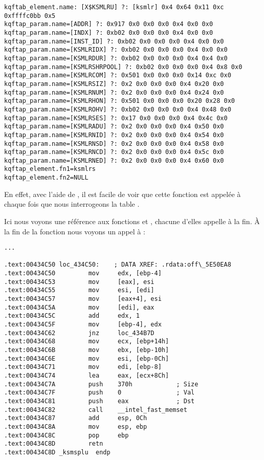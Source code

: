 \begin{lstlisting}[caption=Résultat de \OracleTablesName]
kqftab_element.name: [X$KSMLRU] ?: [ksmlr] 0x4 0x64 0x11 0xc 0xffffc0bb 0x5
kqftap_param.name=[ADDR] ?: 0x917 0x0 0x0 0x0 0x4 0x0 0x0
kqftap_param.name=[INDX] ?: 0xb02 0x0 0x0 0x0 0x4 0x0 0x0
kqftap_param.name=[INST_ID] ?: 0xb02 0x0 0x0 0x0 0x4 0x0 0x0
kqftap_param.name=[KSMLRIDX] ?: 0xb02 0x0 0x0 0x0 0x4 0x0 0x0
kqftap_param.name=[KSMLRDUR] ?: 0xb02 0x0 0x0 0x0 0x4 0x4 0x0
kqftap_param.name=[KSMLRSHRPOOL] ?: 0xb02 0x0 0x0 0x0 0x4 0x8 0x0
kqftap_param.name=[KSMLRCOM] ?: 0x501 0x0 0x0 0x0 0x14 0xc 0x0
kqftap_param.name=[KSMLRSIZ] ?: 0x2 0x0 0x0 0x0 0x4 0x20 0x0
kqftap_param.name=[KSMLRNUM] ?: 0x2 0x0 0x0 0x0 0x4 0x24 0x0
kqftap_param.name=[KSMLRHON] ?: 0x501 0x0 0x0 0x0 0x20 0x28 0x0
kqftap_param.name=[KSMLROHV] ?: 0xb02 0x0 0x0 0x0 0x4 0x48 0x0
kqftap_param.name=[KSMLRSES] ?: 0x17 0x0 0x0 0x0 0x4 0x4c 0x0
kqftap_param.name=[KSMLRADU] ?: 0x2 0x0 0x0 0x0 0x4 0x50 0x0
kqftap_param.name=[KSMLRNID] ?: 0x2 0x0 0x0 0x0 0x4 0x54 0x0
kqftap_param.name=[KSMLRNSD] ?: 0x2 0x0 0x0 0x0 0x4 0x58 0x0
kqftap_param.name=[KSMLRNCD] ?: 0x2 0x0 0x0 0x0 0x4 0x5c 0x0
kqftap_param.name=[KSMLRNED] ?: 0x2 0x0 0x0 0x0 0x4 0x60 0x0
kqftap_element.fn1=ksmlrs
kqftap_element.fn2=NULL
\end{lstlisting}

En effet, avec l'aide de \tracer, il est facile de voir que cette fonction est appelée
à chaque fois que nous interrogeons la table .

Ici nous voyons une référence aux fonctions  et ,
chacune d'elles appelle  à la fin.
À la fin de la fonction  nous voyons un appel à :

\begin{lstlisting}[caption=ksm.o,style=customasmx86]
...

.text:00434C50 loc_434C50:    ; DATA XREF: .rdata:off\_5E50EA8
.text:00434C50         mov     edx, [ebp-4]
.text:00434C53         mov     [eax], esi
.text:00434C55         mov     esi, [edi]
.text:00434C57         mov     [eax+4], esi
.text:00434C5A         mov     [edi], eax
.text:00434C5C         add     edx, 1
.text:00434C5F         mov     [ebp-4], edx
.text:00434C62         jnz     loc_434B7D
.text:00434C68         mov     ecx, [ebp+14h]
.text:00434C6B         mov     ebx, [ebp-10h]
.text:00434C6E         mov     esi, [ebp-0Ch]
.text:00434C71         mov     edi, [ebp-8]
.text:00434C74         lea     eax, [ecx+8Ch]
.text:00434C7A         push    370h            ; Size
.text:00434C7F         push    0               ; Val
.text:00434C81         push    eax             ; Dst
.text:00434C82         call    __intel_fast_memset
.text:00434C87         add     esp, 0Ch
.text:00434C8A         mov     esp, ebp
.text:00434C8C         pop     ebp
.text:00434C8D         retn
.text:00434C8D _ksmsplu  endp
\end{lstlisting}

